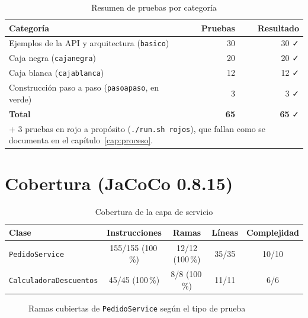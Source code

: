 \documentclass[11pt,a4paper,oneside]{report}
\newcommand{\code}[1]{\texttt{#1}}
\begin{document}
\begin{table}[H]
\centering
\caption{Resumen de pruebas por categoría}
\begin{tabular}{lrr}
\toprule
\textbf{Categoría} & \textbf{Pruebas} & \textbf{Resultado}\\
\midrule
Ejemplos de la API y arquitectura (\code{basico}) & 30 & 30 \textcolor{verde}{\faCheck}\\
Caja negra (\code{cajanegra}) & 20 & 20 \textcolor{verde}{\faCheck}\\
Caja blanca (\code{cajablanca}) & 12 & 12 \textcolor{verde}{\faCheck}\\
Construcción paso a paso (\code{pasoapaso}, en verde) & 3 & 3 \textcolor{verde}{\faCheck}\\
\midrule
\textbf{Total} & \textbf{65} & \textbf{65} \textcolor{verde}{\faCheck}\\
\multicolumn{3}{l}{\scriptsize + 3 pruebas en rojo a propósito (\code{./run.sh rojos}), que fallan como se documenta en el capítulo~\ref{cap:proceso}.}\\
\bottomrule
\end{tabular}
\end{table}

\section{Cobertura (JaCoCo 0.8.15)}
\begin{table}[H]
\centering
\caption{Cobertura de la capa de servicio}
\begin{tabular}{lcccc}
\toprule
\textbf{Clase} & \textbf{Instrucciones} & \textbf{Ramas} & \textbf{Líneas} & \textbf{Complejidad}\\
\midrule
\code{PedidoService} & 155/155 (100\,\%) & 12/12 (100\,\%) & 35/35 & 10/10\\
\code{CalculadoraDescuentos} & 45/45 (100\,\%) & 8/8 (100\,\%) & 11/11 & 6/6\\
\bottomrule
\end{tabular}
\end{table}

\begin{figure}[H]
\centering
{}
\caption{Ramas cubiertas de \code{PedidoService} según el tipo de prueba}
\end{figure}
\end{document}
